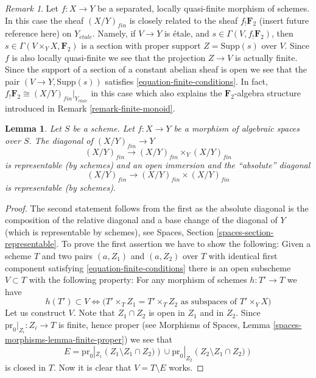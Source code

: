 \documentclass{stacks-project}
\theoremstyle{plain}
\newtheorem{lemma}[subsection]{Lemma}
\theoremstyle{definition}
\theoremstyle{remark}
\newtheorem{remark}[subsection]{Remark}
\numberwithin{equation}{subsection}
\def\etale{{\acute{e}tale}}
\begin{document}
\begin{remark}
\label{remark-finite-quasi-finite-separated-morphism-schemes}
Let $f : X \to Y$ be a separated, locally quasi-finite
morphism of schemes. In this case the sheaf $(X/Y)_{fin}$
is closely related to the sheaf $f_!\mathbf{F}_2$
(insert future reference here) on $Y_\etale$.
Namely, if $V \to Y$ is \'etale, and $s \in \Gamma(V, f_!\mathbf{F}_2)$,
then $s \in \Gamma(V \times_Y X, \mathbf{F}_2)$ is a section
with proper support $Z = \text{Supp}(s)$ over $V$. Since $f$ is
also locally quasi-finite we see that the projection $Z \to V$ is actually
finite. Since the support of a section of a constant abelian sheaf is open
we see that the pair $(V \to Y, \text{Supp}(s))$ satisfies
\ref{equation-finite-conditions}.
In fact, $f_!\mathbf{F}_2 \cong (X/Y)_{fin}|_{Y_\etale}$
in this case which also explains the $\mathbf{F}_2$-algebra structure
introduced in Remark \ref{remark-finite-monoid}.
\end{remark}

\begin{lemma}
\label{lemma-finite-diagonal}
Let $S$ be a scheme.
Let $f : X \to Y$ be a morphism of algebraic spaces over $S$.
The diagonal of $(X/Y)_{fin} \to Y$
$$
(X/Y)_{fin} \longrightarrow (X/Y)_{fin} \times_Y (X/Y)_{fin}
$$
is representable (by schemes) and an open immersion and the ``absolute''
diagonal
$$
(X/Y)_{fin} \longrightarrow (X/Y)_{fin} \times (X/Y)_{fin}
$$
is representable (by schemes).
\end{lemma}

\begin{proof}
The second statement follows from the first as the absolute diagonal
is the composition of the relative diagonal and a base change
of the diagonal of $Y$ (which is representable by schemes), see
Spaces, Section \ref{spaces-section-representable}.
To prove the first assertion we have to show the following:
Given a scheme $T$ and two pairs $(a, Z_1)$ and $(a, Z_2)$ over $T$
with identical first component
satisfying \ref{equation-finite-conditions}
there is an open subscheme $V \subset T$ with the following
property: For any morphism of schemes $h : T' \to T$ we have
$$
h(T') \subset V \Leftrightarrow
\Big(T' \times_T Z_1 = T' \times_T Z_2
\text{ as subspaces of }T' \times_Y X\Big)
$$
Let us construct $V$. Note that $Z_1 \cap Z_2$ is open in $Z_1$
and in $Z_2$. Since $\text{pr}_0|_{Z_i} : Z_i \to T$ is finite,
hence proper (see
Morphisms of Spaces, Lemma \ref{spaces-morphisms-lemma-finite-proper})
we see that
$$
E =
\text{pr}_0|_{Z_1}\left(Z_1 \setminus Z_1 \cap Z_2)\right)
\cup
\text{pr}_0|_{Z_2}\left(Z_2 \setminus Z_1 \cap Z_2)\right)
$$
is closed in $T$. Now it is clear that $V = T \setminus E$ works.
\end{proof}
\end{document}
